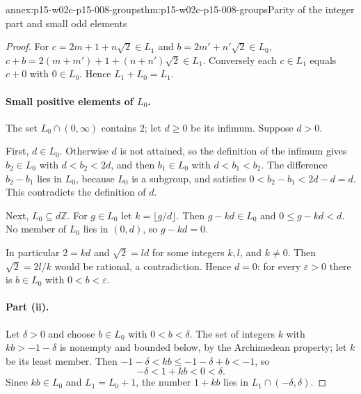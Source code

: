 \begin{annexitem}{annex:p15-w02c-p15-008-groups}{thm:p15-w02c-p15-008-groups}{Parity of the integer part and small odd elements}
\begin{proof}
For \(c=2m+1+n\sqrt2\in L_1\) and \(b=2m'+n'\sqrt2\in L_0\),
\(c+b=2(m+m')+1+(n+n')\sqrt2\in L_1\). Conversely each \(c\in L_1\) equals
\(c+0\) with \(0\in L_0\). Hence \(L_1+L_0=L_1\).

\paragraph{Small positive elements of \(L_0\).}
The set \(L_0\cap(0,\infty)\) contains \(2\); let \(d\geq0\) be its
infimum. Suppose \(d>0\).

First, \(d\in L_0\). Otherwise \(d\) is not attained, so the definition
of the infimum gives \(b_2\in L_0\) with \(d<b_2<2d\), and then
\(b_1\in L_0\) with \(d<b_1<b_2\). The difference \(b_2-b_1\) lies in
\(L_0\), because \(L_0\) is a subgroup, and satisfies
\(0<b_2-b_1<2d-d=d\). This contradicts the definition of \(d\).

Next, \(L_0\subseteq d\mathbb Z\). For \(g\in L_0\) let
\(k=\lfloor g/d\rfloor\). Then \(g-kd\in L_0\) and \(0\leq g-kd<d\).
No member of \(L_0\) lies in \((0,d)\), so \(g-kd=0\).

In particular \(2=kd\) and \(\sqrt2=ld\) for some integers \(k,l\), and
\(k\neq0\). Then \(\sqrt2=2l/k\) would be rational, a contradiction.
Hence \(d=0\): for every \(\varepsilon>0\) there is \(b\in L_0\) with
\(0<b<\varepsilon\).

\paragraph{Part (ii).}
Let \(\delta>0\) and choose \(b\in L_0\) with \(0<b<\delta\). The set of
integers \(k\) with \(kb>-1-\delta\) is nonempty and bounded below, by the
Archimedean property; let \(k\) be its least member. Then
\(-1-\delta<kb\leq-1-\delta+b<-1\), so
\[
 -\delta<1+kb<0<\delta .
\]
Since \(kb\in L_0\) and \(L_1=L_0+1\), the number \(1+kb\) lies in
\(L_1\cap(-\delta,\delta)\).
\end{proof}
\end{annexitem}

